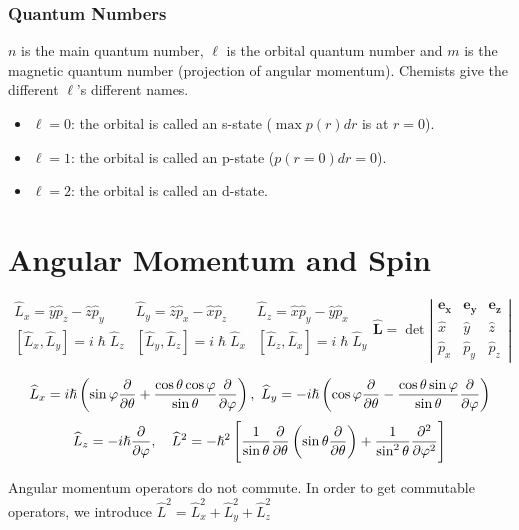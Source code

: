 \documentclass[a4paper, 9pt]{extarticle}
\begin{document}
\subsubsection{Quantum Numbers}

$n$ is the main quantum number, $\ell$ is the orbital quantum number and $m$ is the magnetic quantum number (projection of angular momentum).
Chemists give the different $\ell$'s different names. 
\begin{itemize}
	\item $\ell = 0$: the orbital is called an s-state ($\max p(r) dr$ is at $r = 0$). 
	\item $\ell = 1$: the orbital is called an p-state ($p(r=0) dr = 0$).
	\item $\ell = 2$: the orbital is called an d-state.
\end{itemize}

\section{Angular Momentum and Spin}

$$ \begin{array}{lll}\hat L_x = \hat y \hat p_z - \hat z \hat p_y & \hat L_y = \hat z \hat p_x - \hat x \hat p_z & \hat L_z = \hat x \hat p_y - \hat y \hat p_x \\ \left[\hat L_x,\hat L_y\right] = i \hslash \hat L_z & \left[\hat L_y,\hat L_z\right] = i \hslash \hat L_x & \left[\hat L_z,\hat L_x\right] = i \hslash \hat L_y \\ \end{array} \hat{\bm{L}} = \det \left| \begin{array}{ccc} \bm{e_x} & \bm{e_y} & \bm{e_z} \\ \hat x & \hat y & \hat z \\ \hat p_x & \hat p_y & \hat p_z\end{array} \right| $$

\small {
$$\widehat{L}_x = i \hslash \left( \sin \varphi \frac{\partial }{\partial \theta} + \frac{\cos \theta \cos \varphi}{\sin \theta} \frac{\partial }{\partial \varphi}  \right), \ \widehat{L}_y = -i \hslash \left( \cos \varphi \frac{\partial }{\partial \theta} - \frac{\cos \theta \sin \varphi}{\sin \theta} \frac{\partial }{\partial \varphi} \right)$$
$$\widehat{L}_z = -i \hslash \frac{\partial }{\partial \varphi}, \quad \widehat{L}^2 = -\hslash^2 \left[\frac{1}{\sin \theta} \frac{\partial }{\partial \theta} \left( \sin \theta \frac{\partial }{\partial \theta} \right) + \frac{1}{\sin^2 \theta} \frac{\partial^2 }{\partial \varphi ^2} \right]$$
}

Angular momentum operators do not commute. In order to get commutable operators, we introduce $\hat L^2 = \hat L_x^2 + \hat L_y^2 + \hat L_z^2$
\end{document}
